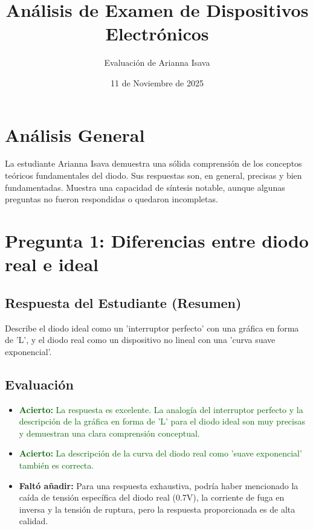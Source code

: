 \documentclass[12pt, a4paper]{article}
\newcommand{\acierto}[1]{\textcolor{darkgreen}{\textbf{Acierto:} #1}}
\newcommand{\faltante}[1]{\textcolor{blue!70!black}{\textbf{Faltó añadir:} #1}}
\begin{document}
\title{Análisis de Examen de Dispositivos Electrónicos}
\author{Evaluación de Arianna Isava}
\date{11 de Noviembre de 2025}
\maketitle

\section*{Análisis General}
La estudiante Arianna Isava demuestra una sólida comprensión de los conceptos teóricos fundamentales del diodo. Sus respuestas son, en general, precisas y bien fundamentadas. Muestra una capacidad de síntesis notable, aunque algunas preguntas no fueron respondidas o quedaron incompletas.

\hrulefill
\vspace{1cm}

\section{Pregunta 1: Diferencias entre diodo real e ideal}

\subsection*{Respuesta del Estudiante (Resumen)}
Describe el diodo ideal como un 'interruptor perfecto' con una gráfica en forma de 'L', y el diodo real como un dispositivo no lineal con una 'curva suave exponencial'.

\subsection*{Evaluación}
\begin{itemize}
    \item \acierto{La respuesta es excelente. La analogía del interruptor perfecto y la descripción de la gráfica en forma de 'L' para el diodo ideal son muy precisas y demuestran una clara comprensión conceptual.}
    \item \acierto{La descripción de la curva del diodo real como 'suave exponencial' también es correcta.}
    \item \faltante{Para una respuesta exhaustiva, podría haber mencionado la caída de tensión específica del diodo real (0.7V), la corriente de fuga en inversa y la tensión de ruptura, pero la respuesta proporcionada es de alta calidad.}
\end{itemize}
\end{document}
